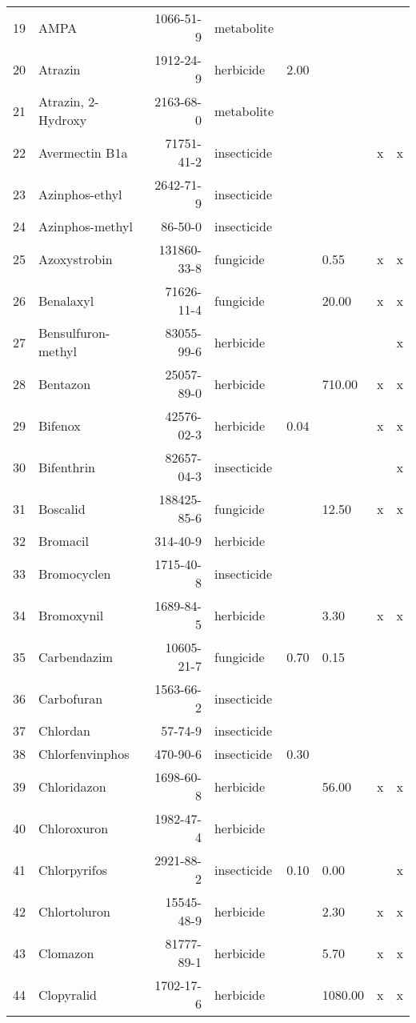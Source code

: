 \begin{longtable}{lp{4cm}rlp{1cm}p{1.5cm}p{1.5cm}p{1cm}}
  19 & AMPA & 1066-51-9 & metabolite &  &  &  &  \\ 
  20 & Atrazin & 1912-24-9 & herbicide & 2.00 &  &  &  \\ 
  21 & Atrazin, 2-Hydroxy & 2163-68-0 & metabolite &  &  &  &  \\ 
  22 & Avermectin B1a & 71751-41-2 & insecticide &  &  & x & x \\ 
  23 & Azinphos-ethyl & 2642-71-9 & insecticide &  &  &  &  \\ 
  24 & Azinphos-methyl & 86-50-0 & insecticide &  &  &  &  \\ 
  25 & Azoxystrobin & 131860-33-8 & fungicide &  & 0.55 & x & x \\ 
  26 & Benalaxyl & 71626-11-4 & fungicide &  & 20.00 & x & x \\ 
  27 & Bensulfuron-methyl & 83055-99-6 & herbicide &  &  &  & x \\ 
  28 & Bentazon & 25057-89-0 & herbicide &  & 710.00 & x & x \\ 
  29 & Bifenox & 42576-02-3 & herbicide & 0.04 &  & x & x \\ 
  30 & Bifenthrin & 82657-04-3 & insecticide &  &  &  & x \\ 
  31 & Boscalid & 188425-85-6 & fungicide &  & 12.50 & x & x \\ 
  32 & Bromacil & 314-40-9 & herbicide &  &  &  &  \\ 
  33 & Bromocyclen & 1715-40-8 & insecticide &  &  &  &  \\ 
  34 & Bromoxynil & 1689-84-5 & herbicide &  & 3.30 & x & x \\ 
  35 & Carbendazim & 10605-21-7 & fungicide & 0.70 & 0.15 &  &  \\ 
  36 & Carbofuran & 1563-66-2 & insecticide &  &  &  &  \\ 
  37 & Chlordan & 57-74-9 & insecticide &  &  &  &  \\ 
  38 & Chlorfenvinphos & 470-90-6 & insecticide & 0.30 &  &  &  \\ 
  39 & Chloridazon & 1698-60-8 & herbicide &  & 56.00 & x & x \\ 
  40 & Chloroxuron & 1982-47-4 & herbicide &  &  &  &  \\ 
  41 & Chlorpyrifos & 2921-88-2 & insecticide & 0.10 & 0.00 &  & x \\ 
  42 & Chlortoluron & 15545-48-9 & herbicide &  & 2.30 & x & x \\ 
  43 & Clomazon & 81777-89-1 & herbicide &  & 5.70 & x & x \\ 
  44 & Clopyralid & 1702-17-6 & herbicide &  & 1080.00 & x & x \\ 

\end{longtable}
